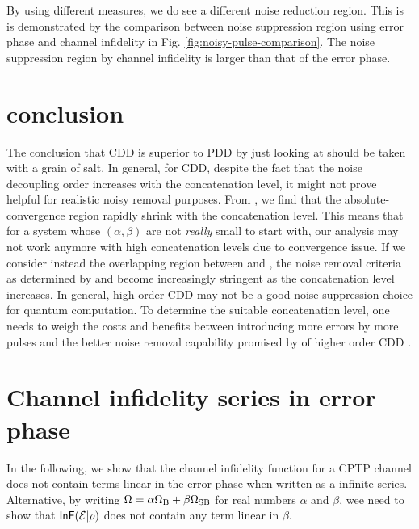 \documentclass[aps,pra,reprint,superscriptaddress]{revtex4-2}
\begin{document}
By using different measures, we do see a different noise reduction region. This is is demonstrated by the comparison between noise suppression region using error phase and channel infidelity in Fig. \ref{fig:noisy-pulse-comparison}. The noise suppression region by channel infidelity is larger than that of the error phase.







\section{conclusion}
The conclusion that CDD is superior to PDD by just looking at  should be taken with a grain of salt. 
In general, for CDD,  despite the fact that the
noise decoupling order increases with the concatenation level,
it might not prove helpful for realistic noisy removal purposes. 
From , we find that the absolute-convergence region rapidly shrink with the concatenation level. This means that for a system whose $(\alpha,\beta)$ are not \emph{really} small to start with, our analysis may not work anymore with high concatenation levels due to convergence issue. 
If we consider instead the overlapping region between  and , the
noise removal criteria as determined by  and  become increasingly stringent as the concatenation level increases.  
In general, high-order CDD may not be a good noise suppression choice for quantum computation. To determine the suitable concatenation level, one needs to weigh the costs and benefits between introducing more errors by more pulses and the better noise removal capability promised by of higher order CDD .







\appendix
\section{Channel infidelity series in error phase}\label{app:infid-beta-series}
In the following, we show that the channel infidelity function  for a CPTP channel does not contain terms linear in the error phase when written as a infinite series.
Alternative, by writing  
$\Omega =  \alpha \Omega_{\mathrm{B}} + \beta \Omega_{\mathrm{SB}}$ for real numbers $\alpha$ and $\beta$, wee need to show that $\operatorname{\mathsf{InF}}(\mathcal{E}|\rho)$ does not contain any term linear in $\beta$.
\end{document}
